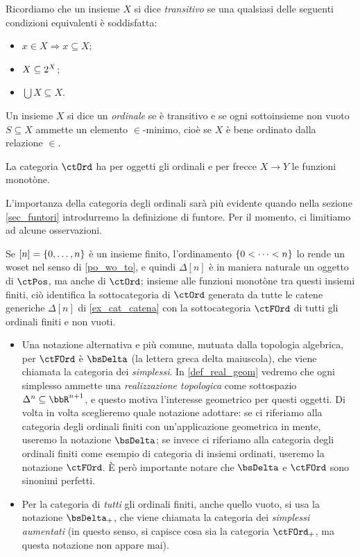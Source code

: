 \begin{example}\label{ex_cat_ordinali}
 Ricordiamo che un insieme \(X\) si dice \emph{transitivo} se una qualsiasi delle seguenti condizioni equivalenti è soddisfatta:
 \begin{itemize}
  \item \(x\in X\Rightarrow x\subseteq X\);
  \item \(X\subseteq 2^{X}\);
  \item \(\bigcup X\subseteq X\).
 \end{itemize}
 Un insieme \(X\) si dice un \emph{ordinale} se è transitivo e se ogni sottoinsieme non vuoto \(S\subseteq X\) ammette un elemento \(\in\)-minimo, cioè se \(X\) è bene ordinato dalla relazione \(\in\).

 La categoria \(\ctOrd\) ha per oggetti gli ordinali e per frecce \(X\to Y\) le funzioni monotòne.
\end{example}
L'importanza della categoria degli ordinali sarà più evidente quando nella sezione \ref{sec_funtori} introdurremo la definizione di funtore. Per il momento, ci limitiamo ad alcune osservazioni.
\begin{remark}\label{rmk_delta_e_deltaPlus}
 Se \([n]=\{\iter[0] n\}\) è un insieme finito, l'ordinamento \(\{\iter[0][<]n\}\) lo rende un woset nel senso di \ref{po_wo_to}, e quindi \(\Delta[n]\) è in maniera naturale un oggetto di \(\ctPos\), ma anche di \(\ctOrd\); insieme alle funzioni monotòne tra questi insiemi finiti, ciò identifica la sottocategoria di \(\ctOrd\) generata da tutte le catene generiche \(\Delta[n]\) di \ref{ex_cat_catena} con la sottocategoria \(\ctFOrd\) di tutti gli ordinali finiti e non vuoti.
 \begin{itemize}
  \item Una notazione alternativa e più comune, mutuata dalla topologia algebrica, per \(\ctFOrd\)	è \(\bsDelta\) (la lettera greca delta maiuscola), che viene chiamata la categoria dei \emph{simplessi}. In \ref{def_real_geom} vedremo che ogni simplesso ammette una \emph{realizzazione topologica} come sottospazio \(\Delta^n\subseteq\bbR^{n+1}\), e questo motiva l'interesse geometrico per questi oggetti. Di volta in volta sceglieremo quale notazione adottare: se ci riferiamo alla categoria degli ordinali finiti con un'applicazione geometrica in mente, useremo la notazione \(\bsDelta\); se invece ci riferiamo alla categoria degli ordinali finiti come esempio di categoria di insiemi ordinati, useremo la notazione \(\ctFOrd\). È però importante notare che \(\bsDelta\) e \(\ctFOrd\) sono sinonimi perfetti.
  \item Per la categoria di \emph{tutti} gli ordinali finiti, anche quello vuoto, si usa la notazione \(\bsDelta_+\), che viene chiamata la categoria dei \emph{simplessi aumentati} (in questo senso, si capisce cosa sia la categoria \(\ctFOrd_+\), ma questa notazione non appare mai).
 \end{itemize}
\end{remark}
